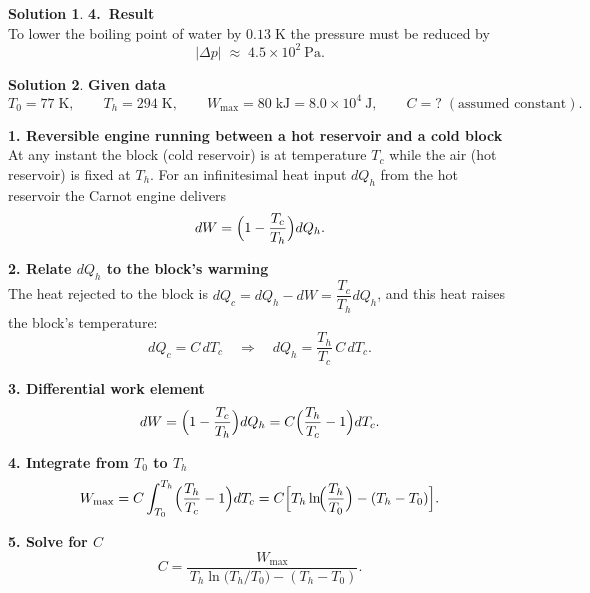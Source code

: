 \documentclass[12pt]{article}
\theoremstyle{definition} %
\newtheorem{solution}{Solution}
\theoremstyle{plain} %
\begin{document}
\begin{solution}
            \medskip
            \textbf{4.\  Result}\\
            To lower the boiling point of water by \(0.13\;\text{K}\) the pressure must be
            reduced by
            \[
              \boxed{\lvert\Delta p\rvert \;\approx\; 4.5\times10^{2}\ \text{Pa}} .
            \]
            \end{solution}
            \begin{solution}
              \textbf{Given data}
              \[
              T_0 = 77\;\text{K}, \qquad
              T_h = 294\;\text{K}, \qquad
              W_{\max} = 80\;\text{kJ}=8.0\times10^{4}\ \text{J},
              \qquad
              C = ?\;(\text{assumed constant}).
              \]
              
              \textbf{1. Reversible engine running between a hot reservoir and a cold block}\\
              At any instant the block (cold reservoir) is at temperature \(T_c\) while the
              air (hot reservoir) is fixed at \(T_h\).
              For an infinitesimal heat input \(dQ_h\) from the hot reservoir the Carnot
              engine delivers
              \[
              dW = \Bigl(1-\frac{T_c}{T_h}\Bigr)dQ_h .
              \]
              
              \textbf{2. Relate \(dQ_h\) to the block’s warming}\\
              The heat rejected to the block is
              \(dQ_c = dQ_h - dW = \dfrac{T_c}{T_h}dQ_h\),
              and this heat raises the block’s temperature:
              \[
              dQ_c = C\,dT_c
              \quad\Longrightarrow\quad
              dQ_h = \frac{T_h}{T_c}\,C\,dT_c .
              \]
              
              \textbf{3. Differential work element}\\
              \[
              dW = \Bigl(1-\frac{T_c}{T_h}\Bigr)dQ_h
                  = C\Bigl(\frac{T_h}{T_c}-1\Bigr)dT_c .
              \]
              
              \textbf{4. Integrate from \(T_0\) to \(T_h\)}\\
              \[
              W_{\max}
                = C\int_{T_0}^{T_h}
                      \Bigl(\frac{T_h}{T_c}-1\Bigr)dT_c
                = C\Bigl[T_h\ln\!\Bigl(\frac{T_h}{T_0}\Bigr)
                          - (T_h-T_0)\Bigr].
              \]
              
              \textbf{5. Solve for \(C\)}\\
              \[
              C
                = \frac{W_{\max}}
                       {\,T_h\ln\!\bigl(T_h/T_0\bigr)-(T_h-T_0)} .
              \]
              

\end{solution}
\end{document}
